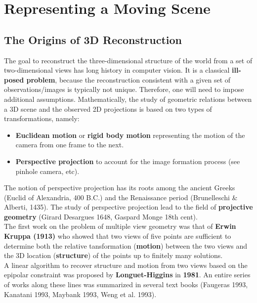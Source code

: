 \section{Representing a Moving Scene}
\label{sec:moving_scene}


\subsection{The Origins of 3D Reconstruction}
\label{sub:the_origins_of_3d_reconstruction}

The goal to reconstruct the three-dimensional structure of the world from
a set of two-dimensional views has long history in computer vision.
It is a classical \textbf{ill-posed problem}, because the reconstruction
consistent with a given set of observations/images is typically not unique.
Therefore, one will need to impose additional assumptions.
Mathematically, the study of geometric relations between a 3D scene
and the observed 2D projections is based on two types of transformations, namely:
\begin{itemize}
	\item \textbf{Euclidean motion} or \textbf{rigid body motion}
		representing the motion of the camera from one frame to the next.
	\item \textbf{Perspective projection} to account for the image formation
		process (see pinhole camera, etc).
\end{itemize}

The notion of perspective projection has its roots among the ancient Greeks
(Euclid of Alexandria, \roughly{} 400 B.C.) and the Renaissance period
(Brunelleschi \& Alberti, 1435).
The study of perspective projection lead to the field of
\textbf{projective geometry} (Girard Desargues 1648, Gaspard Monge 18th cent).\\

The first work on the problem of multiple view geometry was that of
\textbf{Erwin Kruppa (1913)} who showed that two views of five points
are sufficient to determine both the relative tansformation
(\textbf{motion}) between the two views and the 3D location (\textbf{structure})
of the points up to finitely many solutions.\\

A linear algorithm to recover structure and motion from two views based
on the epipolar constraint was proposed by \textbf{Longuet-Higgins}
in \textbf{1981}. An entire series of works along these lines was summarized
in several text books (Faugeras 1993, Kanatani 1993,
Maybank 1993, Weng et al. 1993).\\

